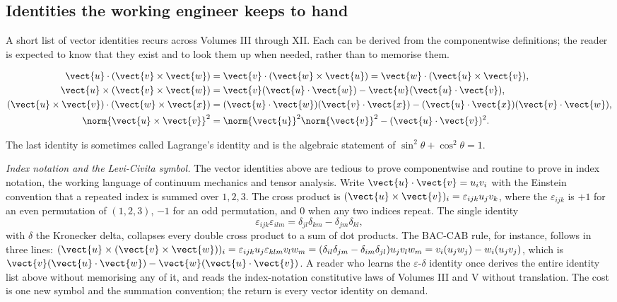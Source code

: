 \subsection{Identities the working engineer keeps to hand}

A short list of vector identities recurs across Volumes III through
XII. Each can be derived from the componentwise definitions; the
reader is expected to know that they exist and to look them up when
needed, rather than to memorise them.

\begin{align*}
  \vect{u} \cdot (\vect{v} \times \vect{w}) &=
    \vect{v} \cdot (\vect{w} \times \vect{u}) =
    \vect{w} \cdot (\vect{u} \times \vect{v}), \\
  \vect{u} \times (\vect{v} \times \vect{w}) &=
    \vect{v}(\vect{u} \cdot \vect{w}) - \vect{w}(\vect{u} \cdot \vect{v}), \\
  (\vect{u} \times \vect{v}) \cdot (\vect{w} \times \vect{x}) &=
    (\vect{u} \cdot \vect{w})(\vect{v} \cdot \vect{x}) -
    (\vect{u} \cdot \vect{x})(\vect{v} \cdot \vect{w}), \\
  \norm{\vect{u} \times \vect{v}}^{2} &=
    \norm{\vect{u}}^{2}\norm{\vect{v}}^{2} -
    (\vect{u} \cdot \vect{v})^{2}.
\end{align*}

The last identity is sometimes called Lagrange's identity and is the
algebraic statement of $\sin^{2}\theta + \cos^{2}\theta = 1$.

\begin{mastery}
\textit{Index notation and the Levi-Civita symbol.} The vector
identities above are tedious to prove componentwise and routine to
prove in index notation, the working language of continuum mechanics
and tensor analysis. Write $\vect{u}\cdot\vect{v} = u_{i}v_{i}$ with
the Einstein convention that a repeated index is summed over
$1, 2, 3$. The cross product is $(\vect{u}\times\vect{v})_{i} =
\varepsilon_{ijk}u_{j}v_{k}$, where the 
$\varepsilon_{ijk}$ is $+1$ for an even permutation of $(1, 2, 3)$,
$-1$ for an odd permutation, and $0$ when any two indices repeat. The
single identity
\[
\varepsilon_{ijk}\varepsilon_{ilm} = \delta_{jl}\delta_{km} -
\delta_{jm}\delta_{kl},
\]
with $\delta$ the Kronecker delta, collapses every double cross
product to a sum of dot products. The BAC-CAB rule, for instance,
follows in three lines: $(\vect{u}\times(\vect{v}\times\vect{w}))_{i} =
\varepsilon_{ijk}u_{j}\varepsilon_{klm}v_{l}w_{m} =
(\delta_{il}\delta_{jm} - \delta_{im}\delta_{jl})u_{j}v_{l}w_{m} =
v_{i}(u_{j}w_{j}) - w_{i}(u_{j}v_{j})$, which is $\vect{v}(\vect{u}
\cdot\vect{w}) - \vect{w}(\vect{u}\cdot\vect{v})$. A reader who learns
the $\varepsilon$-$\delta$ identity once derives the entire identity
list above without memorising any of it, and reads the index-notation
constitutive laws of Volumes III and V without translation. The cost
is one new symbol and the summation convention; the return is every
vector identity on demand.
\end{mastery}

